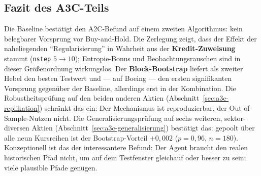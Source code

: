 \subsection{Fazit des A3C-Teils}

Die Baseline bestätigt den A2C-Befund auf einem zweiten Algorithmus: kein belegbarer
Vorsprung vor Buy-and-Hold. Die Zerlegung zeigt, dass der Effekt der naheliegenden
``Regularisierung'' in Wahrheit aus der \textbf{Kredit-Zuweisung} stammt
(\texttt{nstep} $5\to10$); Entropie-Bonus und Beobachtungsrauschen sind in dieser
Größenordnung wirkungslos. Der \textbf{Block-Bootstrap} liefert als zweiter Hebel den
besten Testwert und --- auf Boeing --- den ersten signifikanten Vorsprung gegenüber der
Baseline, allerdings erst in der Kombination. Die Robustheitsprüfung auf den beiden anderen
Aktien (Abschnitt~\ref{sec:a3c-replikation}) schränkt das ein: Der Mechanismus ist
reproduzierbar, der Out-of-Sample-Nutzen nicht. Die Generalisierungsprüfung auf sechs
weiteren, sektor-diversen Aktien (Abschnitt~\ref{sec:a3c-generalisierung}) bestätigt das:
gepoolt über alle neun Kursreihen ist der Bootstrap-Vorteil $+0{,}002$ ($p=0{,}96$,
$n=180$). Konzeptionell ist das der interessantere Befund: Der
Agent braucht den realen historischen Pfad nicht, um auf dem Testfenster gleichauf oder
besser zu sein; viele plausible Pfade genügen.
